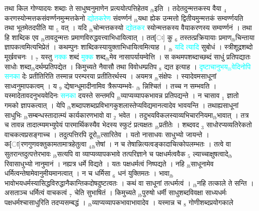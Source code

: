 \documentclass[article,12pt,a4paper]{memoir}%
\newcommand{\quotelemma}[1]{\textcolor{cyan}{#1}}
\begin{document}
	  
	  \pstart \leavevmode%
	तथा किल गोण्यादयः शब्दाः ते साधुष्वनुमाणेन प्रत्ययोत्पत्तिहेतव {\tiny $_{lb}$}इति । तदेतदुन्मत्तकस्य वैया {\tiny $_{4}$} करणस्योन्मत्तकसंवर्ण्णनमुन्मत्तकेनो \quotelemma{द्योतकरेण} संवर्ण्णनं {\tiny $_{lb}$}यथा ह्येक उन्मत्तो द्वितीयमुन्मत्तकं सम्वर्ण्णयति तथा भूतमेतदपीति या {\tiny $_{5}$} वत् । यदि {\tiny $_{lb}$}चोन्मत्तकस्यो \quotelemma{द्योतकर} स्योन्मत्तकस्य वैयाकरणस्य सम्वर्ण्णनं । तथा हि शाब्दिक एव {\tiny $_{lb}$}तावदुन्मत्तः प्रमाणविरुद्धवत्त्वाभिधायित्वात् । तत[ः] कु {\tiny $_{6}$} तस्तत्प्रक्रियायाः प्रमाण{\tiny $_{lb}$}चिन्ताया ज्ञापकत्वमित्यभिप्रेतं । कथम्पुनः शाब्दिकस्यायुक्ताभिधायित्वमित्याह । {\tiny $_{lb}$} \quotelemma{यदि \cite[14a4]{vn-msN} त्यादि} सुबोधं । स्त्रीशूद्रशब्दो मूर्खवचनः । {\tiny $_{7}$} यस्तु \quotelemma{नक्क} शब्दं \quotelemma{मुक्क} शब्द{\tiny $_{lb}$}मेव नासापर्यायम्वेत्ति । स कथमपशब्दाच्छब्दं साधुं प्रतिपद्यातः साधोः शब्दा{\tiny $_{lb}$}दर्थम्प्रतिपद्येत । किमुच्यते नैवासौ तथा विवोधम्प्रतिप {\tiny $_{8}$} द्यत इत्याह । \quotelemma{दृष्टाचानुभय{\tiny $_{lb}$}वेदिनोपि \cite[14b3]{vn-msN} सनका} देः प्रतीतिरिति तस्मान्न परम्परया प्रतीतिरर्थस्य । अयमत्र {\tiny $_{lb}$}संक्षेपः । स्यादेवमसाधूनां साध्वनुमापकत्वम् । य {\tiny $_{9}$} \leavevmode{} द्येषान्धूमादीनामिव त्रैरूप्यम्भवे- {\tiny $_{lb}$} \leavevmode{} न्निश्चितं । तच्च न सम्भवति । यस्मादेतावदनुभयवेदिनः \quotelemma{सनका} दयस्ते सन्तमपि {\tiny $_{lb}$}व्याप्यव्यापकभावन्न प्रतिपद्यन्ते । न चासाव {\tiny $_{1}$} ज्ञातो गमको ज्ञापकत्वात् । येपि {\tiny $_{lb}$}शब्दापशब्दप्रविभागकुशलास्तेप्यविद्यमानत्वादेव भावयन्ति । तथाह्यसाधूनां साधुभिः {\tiny $_{lb}$}सम्बन्धस्तादात्म्यं कार्यकारणभावो वा {\tiny $_{2}$} भवेत । तदुभयविकलस्याव्यभिचारनियमा{\tiny $_{lb}$}भावात् । तत्र च तावन्न तादात्म्यमभ्युपेयं पारमार्थिकस्यैव भेदस्य स्फुटं प्रत्यक्षतः {\tiny $_{lb}$}प्रतीतेः । शब्दवद {\tiny $_{3}$} साधोरप्यव्यतिरेकतो वाचकत्वप्रसङ्गाच्च । तदुत्पत्तिरपि दूरो{\tiny $_{lb}$}त्सारितेव । यतो नासाधवः साधुभ्यो जायन्ते । क[ा]रणगुणवक्तुकामतामात्रहेतुत्वा {\tiny $_{4}$}{\tiny $_{lb}$}त्तेषां । न च तेषान्नित्यत्वङ्कादाचित्कोपलम्भतः । तत्वे वा सुतरान्तदुत्पत्तेरभावः {\tiny $_{lb}$}सत्यपि वा व्याप्यव्यापकभावे तत्परिज्ञाने च पक्षधर्मत्ववैक {\tiny $_{5}$} ल्याच्चाक्षुषत्वादे{\tiny $_{lb}$}रिवासाधुभ्यो नानुमानं । नह्यत्र धर्मे विद्यते । यतः पक्षधर्मत्वं निष्पद्यते । नहि {\tiny $_{lb}$}साधूनामेव धर्मित्वन्तेषामेवानुमीयमानत्वात् । न च धर्मिसा {\tiny $_{6}$} धनं युक्तिमतः । भावा{\tiny $_{lb}$}भावोभयधर्मस्यासिद्धविरुद्धानैकान्तिकदोषदुष्टत्वतः । कथं वा साधूनां तत्धर्मत्वं । {\tiny $_{lb}$}नहि तत्काले ते सन्ति । असताञ्च धर्मित्वं वाचकत्वं {\tiny $_{7}$} चेति सुभाषितं । किमुच्यते {\tiny $_{lb}$}पुरुषो धर्मी साधुशब्दविवक्षा साध्यधर्मः पक्षधर्मश्चासाधुरिति तदप्यसम्बद्धं । {\tiny $_{lb}$}व्याप्यव्यापकभावाभावादेव । यस्मान्न च {\tiny $_{8}$} \leavevmode{} गोणीशब्दप्रयोगकाले 
\end{document}
